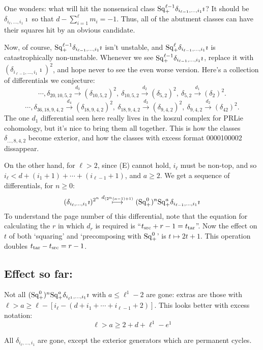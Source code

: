 \documentclass[10pt]{article}
\newcommand{\SqShift}{\Sq_{\smash{+}}}
\newcommand{\Sq}{\mathrm{Sq}}
\begin{document}
\begin{conjectured differentials}
\begin{itemise}
One wonders: what will hit the nonsensical class $\SqShift^{\ell-1}\delta_{i_{\ell-1},\ldots,i_1}\imath$? It should be $\delta_{i_{\ell},\ldots,i_1}\imath$ so that $d-\sum_{i=1}^\ell m_i=-1$. Thus, all of the abutment classes can have their squares hit by an obvious candidate.
\end{itemise}
Now, of course, $\SqShift^{\ell-1}\delta_{i_{\ell-1},\ldots,i_1}\imath$ isn't unstable, and $\SqShift^{\ell}\delta_{i_{\ell-1},\ldots,i_1}\imath$ is catastrophically non-unstable. Whenever we see $\SqShift^{\ell-1}\delta_{i_{\ell-1},\ldots,i_1}\imath$, replace it with $(\delta_{i_{\ell-1},\ldots,i_1}\imath)^2$, and hope never to see the even worse version. Here's a collection of differentials we conjecture:
\[\cdots, \delta_{20,10,5,2}\overset{d_{3}}{\to}(\delta_{10,5,2})^2,\ 
\delta_{10,5,2}\overset{d_{2}}{\to}(\delta_{5,2})^2,\ 
\delta_{5,2}\overset{d_{1}}{\to}(\delta_{2})^2. \]
\[\cdots, \delta_{36,18,9,4,2}\overset{d_{4}}{\to}(\delta_{18,9,4,2})^2,\ 
\delta_{18,9,4,2}\overset{d_{3}}{\to}(\delta_{9,4,2})^2,\ 
\delta_{9,4,2}\overset{d_{2}}{\to}(\delta_{42})^2. \]
The one $d_1$ differential seen here really lives in the koszul complex for PRLie cohomology, but it's nice to bring them all together. This is how the classes $\delta_{\ldots ,8,4,2}$ become exterior, and how the classes with excess format 0000100002 dissappear.

On the other hand, for $\ell>2$, since (E) cannot hold, $i_\ell$ must be non-top, and so $i_\ell< d+(i_1+1)+\cdots +(i_{\ell-1}+1)$, and $a\geq2$. We get a sequence of differentials, for $n\geq0$:
\[(\delta_{i_\ell,\ldots,i_1}\imath)^{2^n}\overset{d_{(2^n(a-1)+1)}}{\mapsto} (\SqShift^0)^{n}\SqShift^a\delta_{i_{\ell-1},\ldots,i_1}\imath\]
To understand the page number of this differential, note that the equation for calculating the $r$ in which $d_r$ is required is ``$t_\textup{src}+r-1=t_\textup{tar}$''. Now the effect on $t$ of both `squaring' and `precomposing with $\SqShift^0$' is $t\mapsto 2t+1$. This operation doubles $t_\textup{tar}-t_\textup{src}=r-1$.

\subsection*{Effect so far:}
\begin{itemise}
\setlength{\parindent}{.25in}
\item Not all $(\SqShift^0)^{n}\SqShift^a\delta_{i_{\ell^1},\ldots,i_1}\imath$ with  $a\leq\ell^1-2$ are gone: extras are those with $\ell>a\geq\ell-[i_\ell-(d+i_1+\cdots +i_{\ell-1}+2)]$. This looks better with excess notation:
\[\ell>a\geq 2+d+\ell^1-e^1\]
\item All $\delta_{i_\ell,\ldots,i_1}$ are gone, except the exterior generators which are permanent cycles.
\end{itemise}


\end{conjectured differentials}
\end{document}
